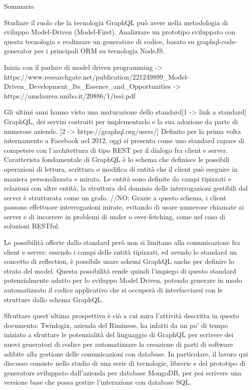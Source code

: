 Sommario

Studiare il ruolo che la tecnologia GraphQL può avere nella metodologia di sviluppo Model-Driven (Model-First).
Analizzare un prototipo sviluppato con questa tecnologia e realizzare un generatore di codice, basato su graphql-code-generator per i principali ORM su tecnologia NodeJS.

Inizia con il parlare di model driven programming -> https://www.researchgate.net/publication/221249899_Model-Driven_Development_Its_Essence_and_Opportunities
-> https://amslaurea.unibo.it/20886/1/tesi.pdf

Gli ultimi anni hanno visto una maturazione dello standard[1 -> link a standard] GraphQL, dei servizi costruiti per implementarlo e la sua adozione da parte di numerose aziende. [2 -> https://graphql.org/users/]
Definito per la prima volta internamente a Facebook nel 2012, oggi si presenta come uno standard capace di competere con l'architettura di tipo REST per il dialogo fra client e server.
Caratterista fondamentale di GraphQL è lo schema che definisce le possibili operazioni di lettura, scrittura o modifica di entità che il client può eseguire in maniera personalizzata e mirata.
Le entità sono definite da campi tipizzati e relazioni con altre entità, la struttura del dominio delle interrogazioni gestibili dal server è strutturata come un grafo.
//NO: Grazie a questo schema, i client possono effettuare interrogazioni mirate, evitando di usare numerose chiamate ai server e di incorrere in problemi di under o over-fetching, come nel caso di soluzioni RESTful.

Le possibilità offerte dallo standard però non si limitano alla comunicazione fra client e server: essendo i campi delle entità tipizzati, ed avendo lo standard un concetto di reflection, è possibile usare 
schemi GraphQL anche per definire lo strato del model.
Questa possibilità rende quindi l'impiego di questo standard potenzialmente adatto per lo sviluppo Model Driven, potendo generare in modo automatizzato il codice applicativo che si occuperà di interfacciarsi con le strutture dallo schema GraphQL.

Sfruttare quest'ultima prospettiva è ciò a cui mira l'attività descritta in questo documento: Twinlogix, azienda del Riminese, ha infatti da un po' di tempo iniziato a sfruttare le potenzialità del linguaggio di GraphQL per scrivere dei nuovi generatori
di codice per automatizzare la creazione di parti di software adibite alla gestione delle comunicazioni con database.
In particolare, il lavoro qui discusso consiste nello studio di una serie di tecnologie, librerie e del prototipo di generatore sviluppato dall'azienda per database MongoDB, per poi scrivere una versione base che possa gestire l'interazione con database SQL.


